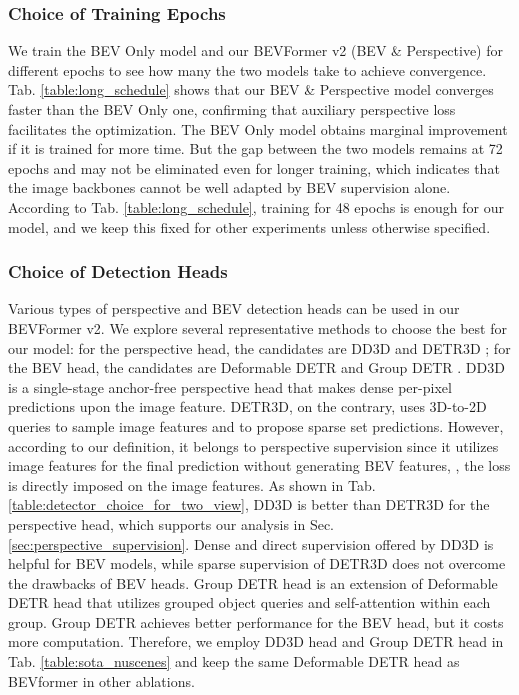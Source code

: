 \documentclass[10pt,twocolumn,letterpaper]{article}
\begin{document}
\subsubsection{Choice of Training Epochs}
We train the BEV Only model and our BEVFormer v2 (BEV \& Perspective) for different epochs to see how many the two models take to achieve convergence.
Tab. \ref{table:long_schedule} shows that our BEV \& Perspective model converges faster than the BEV Only one, confirming that auxiliary perspective loss facilitates the optimization.
The BEV Only model obtains marginal improvement if it is trained for more time. 
But the gap between the two models remains at 72 epochs and may not be eliminated even for longer training, which indicates that the image backbones cannot be well adapted by BEV supervision alone.
According to Tab. \ref{table:long_schedule}, training for 48 epochs is enough for our model, and we keep this fixed for other experiments unless otherwise specified. 

\subsubsection{Choice of Detection Heads}
Various types of perspective and BEV detection heads can be used in our BEVFormer v2. 
We explore several representative methods to choose the best for our model: for the perspective head, the candidates are DD3D \cite{DD3D} and DETR3D \cite{DETR3D}; for the BEV head, the candidates are Deformable DETR \cite{deformable-detr} and Group DETR \cite{groupdetr}. 
DD3D is a single-stage anchor-free perspective head that makes dense per-pixel predictions upon the image feature. 
DETR3D, on the contrary, uses 3D-to-2D queries to sample image features and to propose sparse set predictions. 
However, according to our definition, it belongs to perspective supervision since it utilizes image features for the final prediction without generating BEV features, \ie, the loss is directly imposed on the image features.
As shown in Tab. \ref{table:detector_choice_for_two_view}, DD3D is better than DETR3D for the perspective head, which supports our analysis in Sec. \ref{sec:perspective_supervision}. 
Dense and direct supervision offered by DD3D is helpful for BEV models, while sparse supervision of DETR3D does not overcome the drawbacks of BEV heads. 
Group DETR head is an extension of Deformable DETR head that utilizes grouped object queries and self-attention within each group.
Group DETR achieves better performance for the BEV head, but it costs more computation.
Therefore, we employ DD3D head and Group DETR head in Tab. \ref{table:sota_nuscenes} and keep the same Deformable DETR head as BEVformer \cite{bevformer} in other ablations.
\end{document}
